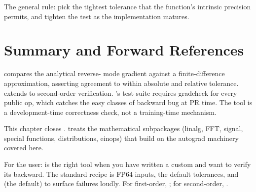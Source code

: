 The general rule: pick the tightest tolerance that the function's
intrinsic precision permits, and tighten the test as the
implementation matures.

\section{Summary and Forward References}
\label{sec:gradcheck:summary}

 compares the analytical reverse-
mode gradient against a finite-difference approximation, asserting
agreement to within absolute and relative tolerance.
 extends to second-order verification.
\Lucid's test suite requires gradcheck for every public op, which
catches the easy classes of backward bug at PR time. The tool is
a development-time correctness check, not a training-time
mechanism.

This chapter closes . 
treats the mathematical subpackages (linalg, FFT, signal,
special functions, distributions, einops) that build on the
autograd machinery covered here.

\begin{lucidnote}
For the user:  is the right tool when you have
written a custom  and want to verify its backward.
The standard recipe is FP64 inputs, the default tolerances, and
 (the default) to surface failures
loudly. For first-order, ; for second-order,
.
\end{lucidnote}
